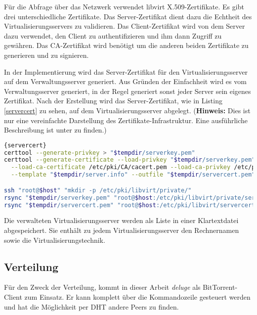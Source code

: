 Für die Abfrage über das Netzwerk verwendet libvirt X.509-Zertifikate. Es gibt drei unterschiedliche Zertifikate. Das Server-Zertifikat dient dazu die Echtheit des Virtualisierungsservers zu validieren. Das Client-Zertifikat wird von dem Server dazu verwendet, den Client zu authentifizieren und ihm dann Zugriff zu gewähren. Das CA-Zertifikat wird benötigt um die anderen beiden Zertifikate zu generieren und zu signieren.

In der Implementierung wird das Server-Zertifikat für den Virtualisierungsserver auf dem Verwaltungsserver generiert. Aus Gründen der Einfachheit wird es vom Verwaltungsserver generiert, in der Regel generiert sonst jeder Server sein eigenes Zertifikat. Nach der Erstellung wird das Server-Zertifikat, wie in Listing \ref{servercert} zu sehen, auf dem Virtualisierungsserver abgelegt. (\textbf{Hinweis:} Dies ist nur eine vereinfachte Darstellung des Zertifikate-Infrastruktur. Eine ausführliche Beschreibung ist unter \cite{libvirttls} zu finden.)
\\
\begin{lstlisting}[caption=Erstellung des Server-Zertifikats für den jeweiligen Virtualisierungsserver,language=Bash,label=servercert]{servercert}
certtool --generate-privkey > "$tempdir/serverkey.pem"
certtool --generate-certificate --load-privkey "$tempdir/serverkey.pem" \
  --load-ca-certificate /etc/pki/CA/cacert.pem --load-ca-privkey /etc/pki/CA/private/cakey.pem \
  --template "$tempdir/server.info" --outfile "$tempdir/servercert.pem" 2> "/var/log/cow.log"

ssh "root@$host" "mkdir -p /etc/pki/libvirt/private/"
rsync "$tempdir/serverkey.pem" "root@$host:/etc/pki/libvirt/private/serverkey.pem"
rsync "$tempdir/servercert.pem" "root@$host:/etc/pki/libvirt/servercert.pem"
\end{lstlisting}

Die verwalteten Virtualisierungsserver werden als Liste in einer Klartextdatei abgespeichert. Sie enthält zu jedem Virtualisierungsserver den Rechnernamen sowie die Virtualisierungstechnik. \label{vhosts}

\subsection{Verteilung}\label{verteilung}
Für den Zweck der Verteilung, kommt in dieser Arbeit \textit{deluge} als BitTorrent-Client zum Einsatz. Er kann komplett über die Kommandozeile gesteuert werden und hat die Möglichkeit per DHT andere Peers zu finden.

